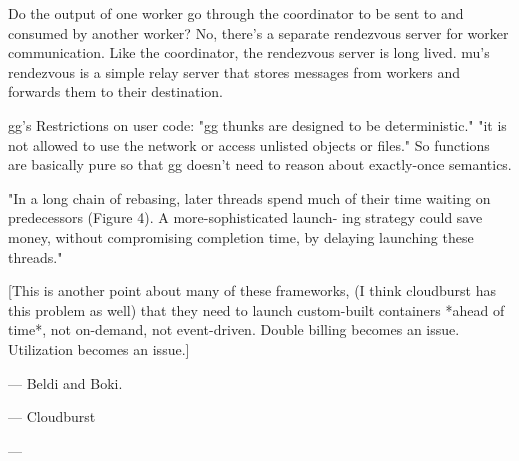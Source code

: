 Do the output of one worker go through the coordinator to be sent to and
consumed by another worker? No, there's a separate rendezvous server for
worker communication. Like the coordinator, the rendezvous server is long
lived. mu’s rendezvous is a simple relay server that stores messages from
workers and forwards them to their destination.


gg's Restrictions on user code: "gg thunks are designed to be deterministic."
"it is not allowed to use the network or access unlisted objects or files." So
functions are basically pure so that gg doesn't need to reason about
exactly-once semantics.


"In a long chain
of rebasing, later threads spend much of their time waiting
on predecessors (Figure 4). A more-sophisticated launch-
ing strategy could save money, without compromising
completion time, by delaying launching these threads."

[This is another point about many of these frameworks, (I think cloudburst has
this problem as well) that they need to launch custom-built containers *ahead
of time*, not on-demand, not event-driven. Double billing becomes an issue.
Utilization becomes an issue.]

--- 
Beldi and Boki.

--- 
Cloudburst

---
